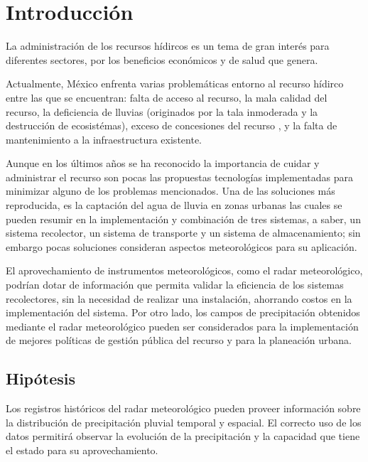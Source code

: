 \documentclass[letterpaper,12pt,oneside]{book}
\begin{document}


\chapter{Introducción}
    La administración de los recursos hídircos es un tema de gran interés para diferentes sectores, por los beneficios económicos y de salud que genera.

    Actualmente, México enfrenta varias problemáticas entorno al recurso hídirco entre las que se encuentran: falta de acceso al recurso, la mala calidad del recurso, la deficiencia de lluvias (originados por la tala inmoderada y la destrucción de ecosistémas), exceso de concesiones del recurso \cite{jornada:agua}, y la falta de mantenimiento a la infraestructura existente.

    Aunque en los últimos años se ha reconocido la importancia de cuidar y administrar el recurso \cite{de2019objetivo} \cite{mex:procaptar} son pocas las propuestas tecnologías implementadas para minimizar alguno de los problemas mencionados.
    Una de las soluciones más reproducida, es la captación del agua de lluvia en zonas urbanas\cite{comision2016lineamientos} \cite{hugues2019captacion} \cite{nickisch2018sistemas} \cite{van2013captacion} las cuales se pueden resumir en la implementación y combinación de tres sistemas, a saber, un sistema recolector, un sistema de transporte y un sistema de almacenamiento; sin embargo pocas soluciones consideran aspectos meteorológicos para su aplicación.

    El aprovechamiento de instrumentos meteorológicos, como el radar meteorológico, podrían dotar de información que permita validar la eficiencia de los sistemas recolectores, sin la necesidad de realizar una instalación, ahorrando costos en la implementación del sistema. Por otro lado, los campos de precipitación obtenidos mediante el radar meteorológico pueden ser considerados para la implementación de mejores políticas de gestión pública del recurso y para la planeación urbana.
\newpage
    \section{Hipótesis}
        Los registros históricos del radar meteorológico pueden proveer información sobre la distribución de precipitación pluvial temporal y espacial. El correcto uso de los datos permitirá observar la evolución de la precipitación y la capacidad que tiene el estado para su aprovechamiento.
\end{document}
